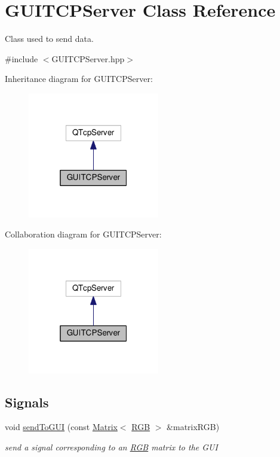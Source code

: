 \hypertarget{class_g_u_i_t_c_p_server}{}\section{G\+U\+I\+T\+C\+P\+Server Class Reference}
\label{class_g_u_i_t_c_p_server}


Class used to send data.  




{\ttfamily \#include $<$G\+U\+I\+T\+C\+P\+Server.\+hpp$>$}



Inheritance diagram for G\+U\+I\+T\+C\+P\+Server\+:
\nopagebreak
\begin{figure}[H]
\begin{center}
\leavevmode
\includegraphics[width=163pt]{class_g_u_i_t_c_p_server__inherit__graph}
\end{center}
\end{figure}


Collaboration diagram for G\+U\+I\+T\+C\+P\+Server\+:
\nopagebreak
\begin{figure}[H]
\begin{center}
\leavevmode
\includegraphics[width=163pt]{class_g_u_i_t_c_p_server__coll__graph}
\end{center}
\end{figure}
\subsection*{Signals}
\begin{DoxyCompactItemize}
\item 
void \mbox{\hyperlink{class_g_u_i_t_c_p_server_ad7b1dc0a7deda15818913d936b617278}{send\+To\+G\+UI}} (const \mbox{\hyperlink{class_matrix}{Matrix}}$<$ \mbox{\hyperlink{class_r_g_b}{R\+GB}} $>$ \&matrix\+R\+GB)
\begin{DoxyCompactList}\small\item\em send a signal corresponding to an \mbox{\hyperlink{class_r_g_b}{R\+GB}} matrix to the G\+UI \end{DoxyCompactList}\end{DoxyCompactItemize}

